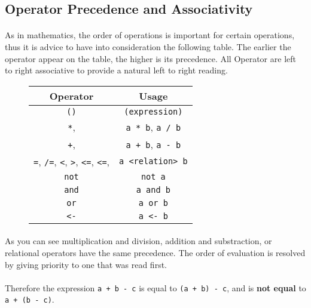 \subsection{Operator Precedence and Associativity}

\paragraph{} As in mathematics, the order of operations is important for certain
operations, thus it is advice to have into consideration the following table.
The earlier the operator appear on the table, the higher is its precedence. All
Operator are left to right associative to provide a natural left to right
reading.

\begin{figure}[h]
    \centering
    \begin{tabular}{cc}
        \toprule
        \textbf{Operator} & \textbf{Usage} \\
        \midrule \texttt{()} & \texttt{(expression)}\\
        \midrule \texttt{*}, \text{/} & \texttt{a * b}, \texttt{a / b}\\
        \midrule \texttt{+}, \text{-} & \texttt{a + b}, \texttt{a {-} b}\\
        \midrule
        \texttt{=}, \texttt{/=}, \texttt{<},
        \texttt{>}, \texttt{<=}, \texttt{<=}, &
        \texttt{a <relation> b}\\
        \midrule \texttt{not} & \texttt{not a}\\
        \midrule \texttt{and} & \texttt{a and b}\\
        \midrule \texttt{or} & \texttt{a or b}\\
        \midrule \texttt{<-} & \texttt{a <- b}\\
        \bottomrule
    \end{tabular}
\end{figure}

\paragraph{} As you can see multiplication and division, addition and
substraction, or relational operators have the same precedence. The order of
evaluation is resolved by giving priority to one that was read first.

\paragraph{} Therefore the expression \texttt{a {+} b {-} c} is equal to
\texttt{(a {+} b) {-} c}, and is \textbf{not equal} to \texttt{a {+} (b {-} c)}.

